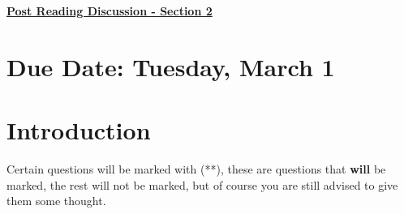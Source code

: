 \documentclass[12pt]{article} %
\begin{document}
	\renewcommand*{\coursecode}{MATH 235} %
	\renewcommand*{\assgnnumber}{Assignment 1} %
	\renewcommand*{\submdate}{September 14, 2021} %
	\renewcommand*{\studentfname}{Abdullah} %
	\renewcommand*{\studentlname}{Zubair} %
    \renewcommand*{\proofname}{Proof:}

	\renewcommand\qedsymbol{$\blacksquare$}
	\setfigpath
	\fancyhfoffset[L,O]{0pt} %




\begin{center}
	\textbf{\underline{\Huge{Post Reading Discussion - Section 2}}}
\end{center}

\section*{Due Date: Tuesday, March 1}
\section*{Introduction}
Certain questions will be marked with (**), these are questions that \textbf{will} be marked, the rest will not be
marked, but of course you are still advised to give them some thought.
\end{document}
